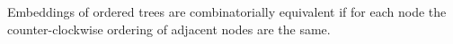 \documentclass[10pt]{CSUNthesis}
\theoremstyle{plain}%
\theoremstyle{definition}
\theoremstyle{remark}
\newcommand{\HH}{{\cal H}} %
\renewcommand{\PP}{{\cal P}} %
\renewcommand{\it}[1]{{\textit{#1}}}
\newcommand{\rn}[1]{\lowercase\expandafter{(\romannumeral #1\relax)}}
\begin{document}
Embeddings of ordered trees are combinatorially equivalent if for each node the counter-clockwise ordering of adjacent nodes are the same. 




\end{document}
